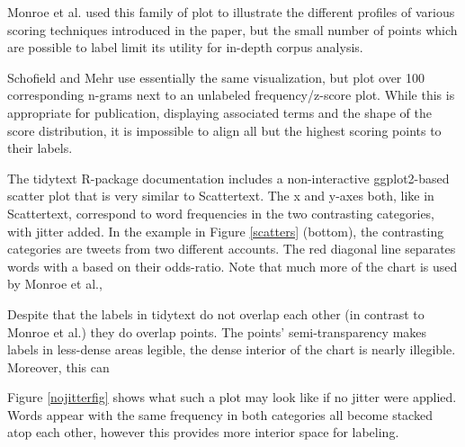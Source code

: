 \documentclass[11pt]{article}
\begin{document}
Monroe et al.  used this family of plot to illustrate the different profiles of various scoring techniques introduced in the paper, but the small number of points which are possible to label limit its utility for in-depth corpus analysis.  

Schofield and Mehr  use essentially the same visualization, but plot over 100 corresponding n-grams next to an unlabeled frequency/z-score plot.  While this is appropriate for publication, displaying associated terms and the shape of the score distribution, it is impossible to align all but the highest scoring points to their labels. 

The tidytext R-package \cite{tidytext} documentation includes a non-interactive ggplot2-based \cite{ggplot2} scatter plot that is very similar to Scattertext.   The x and y-axes both, like in Scattertext, correspond to word frequencies in the two contrasting categories, with jitter added.   In the example in Figure \ref{scatters} (bottom), the contrasting categories are tweets from two different accounts.  The red diagonal line separates words with a based on their odds-ratio.  Note that much more of the chart is used by Monroe et al., 

Despite that the labels in tidytext do not overlap each other (in contrast to Monroe et al.) they do overlap points.  The points' semi-transparency makes labels in less-dense areas legible, the dense interior of the chart is nearly illegible.  Moreover, this can 

Figure \ref{nojitterfig} shows what such a plot may look like if no jitter were applied.  Words appear with the same frequency in both categories all become stacked atop each other, however this provides more interior space for labeling. 
\end{document}
